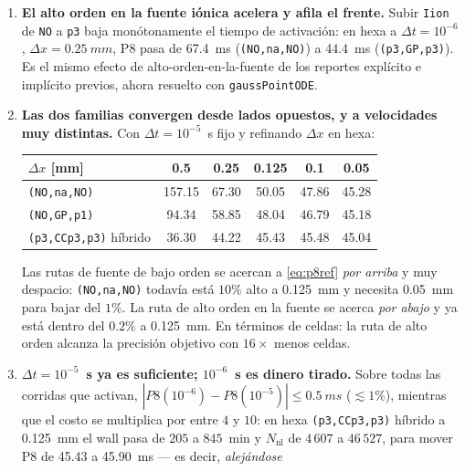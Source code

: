 \documentclass[11pt,a4paper]{article}
\newcommand{\code}[1]{\texttt{\small #1}}
\begin{document}
\begin{enumerate}[topsep=3pt,itemsep=3pt,leftmargin=1.5em]
  \item \textbf{El alto orden en la fuente iónica acelera y afila el frente.} Subir
        \code{Iion} de \code{NO} a \code{p3} baja monótonamente el tiempo de
        activación: en hexa a $\Delta t=10^{-6}$, $\Delta x=\SI{0.25}{mm}$, P8 pasa
        de \SI{67.4}{ms} (\code{(NO,na,NO)}) a \SI{44.4}{ms} (\code{(p3,GP,p3)}). Es
        el mismo efecto de alto-orden-en-la-fuente de los reportes explícito e
        implícito previos, ahora resuelto con \code{gaussPointODE}.
  \item \textbf{Las dos familias convergen desde lados opuestos, y a velocidades muy
        distintas.} Con $\Delta t=10^{-5}$~s fijo y refinando $\Delta x$ en hexa:
        \begin{center}\footnotesize
        \begin{tabular}{lccccc}
        \toprule
        $\Delta x$ [mm] & 0.5 & 0.25 & 0.125 & 0.1 & 0.05\\
        \midrule
        \code{(NO,na,NO)}            & 157.15 & 67.30 & 50.05 & 47.86 & 45.28\\
        \code{(NO,GP,p1)}            & 94.34  & 58.85 & 48.04 & 46.79 & 45.18\\
        \code{(p3,CCp3,p3)} híbrido  & 36.30  & 44.22 & 45.43 & 45.48 & 45.04\\
        \bottomrule
        \end{tabular}
        \end{center}
        Las rutas de fuente de bajo orden se acercan a \eqref{eq:p8ref}
        \emph{por arriba} y muy despacio: \code{(NO,na,NO)} todavía está $10\%$ alto
        a \SI{0.125}{mm} y necesita \SI{0.05}{mm} para bajar del $1\%$. La ruta de
        alto orden en la fuente se acerca \emph{por abajo} y ya está dentro del
        $0.2\%$ a \SI{0.125}{mm}. En términos de celdas: la ruta de alto orden
        alcanza la precisión objetivo con $16\times$ menos celdas.
  \item \textbf{$\Delta t=10^{-5}$~s ya es suficiente; $10^{-6}$~s es dinero tirado.}
        Sobre todas las corridas que activan, $|P8(10^{-6})-P8(10^{-5})|\le
        \SI{0.5}{ms}$ ($\lesssim 1\%$), mientras que el costo se multiplica por
        entre $4$ y $10$: en hexa \code{(p3,CCp3,p3)} híbrido a \SI{0.125}{mm} el
        wall pasa de $205$ a $845$~min y $N_{\mathrm{nl}}$ de $4\,607$ a $46\,527$,
        para mover P8 de \SI{45.43}{} a \SI{45.90}{ms} --- es decir, \emph{alejándose}

\end{enumerate}
\end{document}
